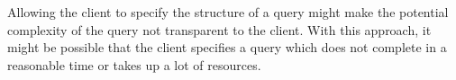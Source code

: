 \bigskip

\noindent Allowing the client to specify the structure of a query might make the potential complexity of the query not transparent to the client. With this approach, it might be possible that the client specifies a query which does not complete in a reasonable time or takes up a lot of resources. \cite{book:2018:richardson:background:bff:microservices-patterns}





